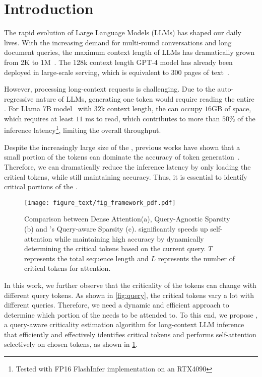 \section{Introduction}
The rapid evolution of Large Language Models (LLMs) has shaped our daily lives. With the increasing demand for multi-round conversations and long document queries, the maximum context length of LLMs has dramatically grown from 2K to 1M~\cite{liu2024world,peng2023yarn,tworkowski2023focused}. The 128k context length GPT-4 model has already been deployed in large-scale serving, which is equivalent to 300 pages of text~\cite{openaiannouncement}.  

However, processing long-context requests is challenging. Due to the auto-regressive nature of LLMs, generating one token would require reading the entire \kvc{}. For Llama 7B model~\cite{touvron2023llama} with $32$k context length, the \kvc{} can occupy $16$GB of space, which requires at least $11$ ms to read, which contributes to more than $50$\% of the inference latency\footnote{Tested with FP16 FlashInfer implementation on an RTX4090}, limiting the overall throughput.

Despite the increasingly large size of the \kvc{}, previous works have shown that a small portion of the tokens can dominate the accuracy of token generation~\cite{zhang2023h2o, ge2024model}. Therefore, we can dramatically reduce the inference latency by only loading the critical tokens, while still maintaining accuracy. Thus, it is essential to identify critical portions of the \kvc{}.

\begin{figure}
    \centering
     \texttt{[image: figure\_text/fig\_framework\_pdf.pdf]}
    \caption{Comparison between Dense Attention(a), Query-Agnostic Sparsity (b) and \method's Query-aware Sparsity (c). \method significantly speeds up self-attention while maintaining high accuracy by dynamically determining the critical tokens based on the current query. $T$ represents the total sequence length and $L$ represents the number of critical tokens for attention.}
    \label{fig:framework}
\end{figure}

In this work, we further observe that the criticality of the tokens can change with different query tokens. As shown in \fig\ref{fig:query}, the critical tokens vary a lot with different queries. Therefore, we need a dynamic and efficient approach to determine which portion of the \kvc{} needs to be attended to. To this end, we propose \method, a query-aware criticality estimation algorithm for long-context LLM inference that efficiently and effectively identifies critical \kvc{} tokens and performs self-attention selectively on chosen tokens, as shown in \fig\ref{fig:framework}.

